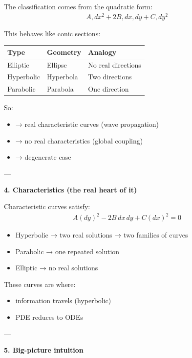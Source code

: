 \documentclass[12pt,a4paper]{report}
\begin{document}
\begin{description}
\begin{description}
The classification comes from the quadratic form:
\begin{align*}
A,dx^2 + 2B,dx,dy + C,dy^2
\end{align*}

This behaves like conic sections:

\begin{tabular}{|l|l|l|}
\hline
   Type       & Geometry  & Analogy            \\   
\hline
   Elliptic   & Ellipse   & No real directions \\   
   Hyperbolic & Hyperbola & Two directions     \\   
   Parabolic  & Parabola  & One direction      \\   
\hline
\end{tabular}

So:

\begin{itemize}
\item {} → real characteristic curves (wave propagation)
\item {} → no real characteristics (global coupling)
\item {} → degenerate case
\end{itemize}

---

\item \textbf{4. Characteristics (the real heart of it)}

Characteristic curves satisfy:
\begin{align*}
A(dy)^2 - 2B\,dx\,dy + C(dx)^2 = 0
\end{align*}

\begin{itemize}
\item Hyperbolic → two real solutions → two families of curves
\item Parabolic → one repeated solution
\item Elliptic → no real solutions
\end{itemize}

These curves are where:

\begin{itemize}
\item information travels (hyperbolic)
\item PDE reduces to ODEs
\end{itemize}

---

\item \textbf{5. Big-picture intuition}


\end{description}
\end{description}
\end{document}
